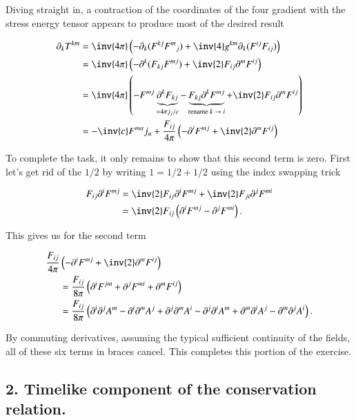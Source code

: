 Diving straight in, a contraction of the coordinates of the four gradient with the stress energy tensor appears to produce most of the desired result

\begin{align*}
\partial_k T^{k m} 
&=
\inv{4 \pi} \left( 
-\partial_k( F^{k j} {F^{m}}_j ) 
+ \inv{4} g^{k m} \partial_k 
(F^{i j} F_{i j}) 
\right) \\
&=
\inv{4 \pi} \left( 
-\partial^k( F_{k j} F^{m j} ) + \inv{2} F_{i j} \partial^m F^{i j} 
\right) \\
&=
\inv{4 \pi} \left( 
-F^{m j} \underbrace{\partial^k F_{k j} }_{= 4 \pi j_j/c}
-\underbrace{F_{k j} \partial^k F^{m j} }_{\text{rename $k \rightarrow i$}}
+ \inv{2} F_{i j} \partial^m F^{i j} 
\right) \\
&=
- \inv{c} F^{m a} j_a
+\frac{F_{i j}}{4 \pi} \left( 
-\partial^i F^{m j} + \inv{2} \partial^m F^{i j} 
\right) \\
\end{align*}

To complete the task, it only remains to show that this second term is zero.  First let's get rid of the $1/2$ by writing $1 = 1/2 + 1/2$ using the index swapping trick

\begin{align*}
F_{i j} \partial^i F^{m j} 
&= 
\inv{2} F_{i j} \partial^i F^{m j} + \inv{2} F_{j i} \partial^j F^{m i} \\
&= 
\inv{2} F_{i j} \left( \partial^i F^{m j} - \partial^j F^{m i} \right).
\end{align*}

This gives us for the second term

\begin{align*}
\frac{F_{i j}}{4 \pi} &\left( -\partial^i F^{m j} + \inv{2} \partial^m F^{i j} \right)  \\
&=
\frac{F_{i j}}{8 \pi} \left( \partial^i F^{j m} + \partial^j F^{m i} + \partial^m F^{i j} \right) \\
&=
\frac{F_{i j}}{8 \pi} \left( 
\partial^i \partial^j A^m
-\partial^i \partial^m A^j
+\partial^j \partial^m A^i
-\partial^j \partial^i A^m
+\partial^m \partial^i A^j
-\partial^m \partial^j A^i
\right).
\end{align*}

By commuting derivatives, assuming the typical sufficient continuity of the fields, all of these six terms in braces cancel.  This completes this portion of the exercise.

\subsection{2. Timelike component of the conservation relation.}

